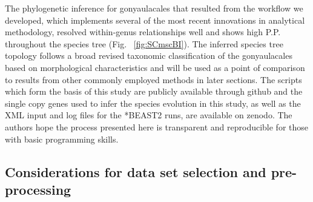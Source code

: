 \documentclass[12pt]{article}
\begin{document}
The phylogenetic inference for gonyaulacales that resulted from the workflow we developed, which implements several of the most recent innovations in analytical methodology, resolved within-genus relationships well and shows high P.P. throughout the species tree (Fig. ~\ref{fig:SCmscBI}). 
The inferred species tree topology follows a broad revised taxonomic classification of the gonyaulacales based on morphological characteristics \cite{hoppenrath2017dinoflagellate} and will be used as a point of comparison to results from other commonly employed methods in later sections. 
The scripts which form the basis of this study are publicly available through github and the single copy genes used to infer the species evolution in this study, as well as the XML input and log files for the *BEAST2 runs, are available on zenodo. 
The authors hope the process presented here is transparent and reproducible for those with basic programming skills. 
\subsection*{Considerations for data set selection and pre-processing}
\end{document}
